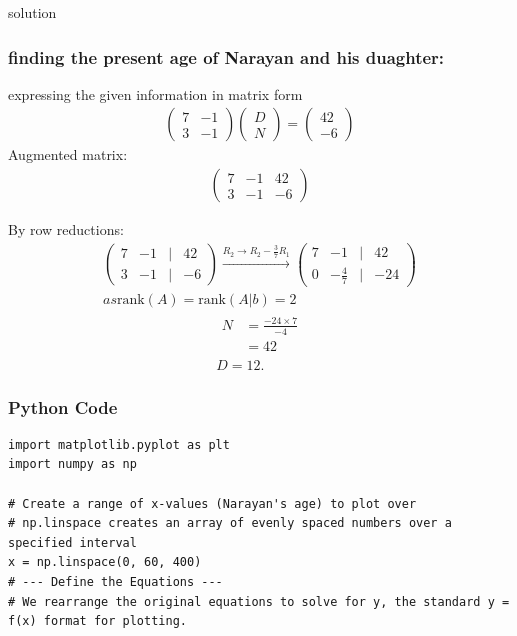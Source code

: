 \documentclass{beamer}
\begin{document}
\begin{frame}{solution}
\frametitle{finding the present age of Narayan and his duaghter:}
expressing the given information in matrix form
\begin{align}
\begin{pmatrix}7 & -1 \\3 & -1\end{pmatrix}\begin{pmatrix}D \\N\end{pmatrix}=\begin{pmatrix}42 \\-6\end{pmatrix}
\end{align}
Augmented matrix:
\begin{align}
\left(\begin{array}{cc|c}7 & -1 & 42 \\3 & -1 & -6\end{array}\right)
\end{align}
\end{frame}
\begin{frame}
By row reductions:\\
\begin{align}
\begin{pmatrix}7 & -1 & | & 42 \\3 & -1 & | & -6\end{pmatrix}\xrightarrow{R_2 \rightarrow R_2 - \frac{3}{7} R_1}\begin{pmatrix}7 & -1 & | & 42 \\0 & -\frac{4}{7} & | & -24\end{pmatrix}\\
as \text{rank}(A) = \text{rank}(A|b) = 2
\end{align}
\begin{align}
\begin{aligned}N &= \frac{-24 \times 7}{-4} \\&= 42\end{aligned}\\
D = 12.
\end{align}
\end{frame}

\begin{frame}[fragile]
    \frametitle{Python Code}
    \begin{lstlisting}
import matplotlib.pyplot as plt
import numpy as np

# Create a range of x-values (Narayan's age) to plot over
# np.linspace creates an array of evenly spaced numbers over a specified interval
x = np.linspace(0, 60, 400)
# --- Define the Equations ---
# We rearrange the original equations to solve for y, the standard y = f(x) format for plotting.
\end{lstlisting}
\end{frame}
\end{document}
